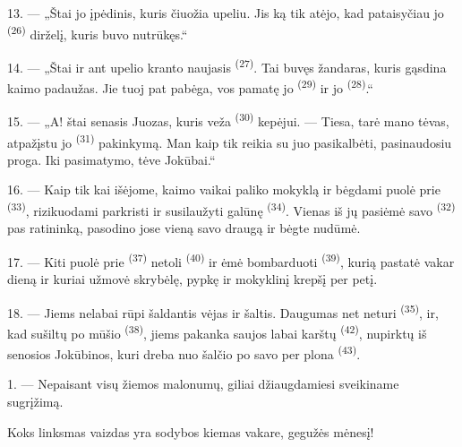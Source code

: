 13. --- „Štai jo įpėdinis, kuris čiuožia upeliu. Jis ką tik atėjo, kad pataisyčiau
jo  \textsuperscript{(26)} dirželį, kuris buvo nutrūkęs.“

14. --- „Štai ir ant upelio kranto naujasis 
\textsuperscript{(27)}. Tai buvęs žandaras, kuris gąsdina kaimo padaužas. Jie tuoj
pat pabėga, vos pamatę jo  \textsuperscript{(29)} ir jo
 \textsuperscript{(28)}.“

15. --- „A! štai senasis Juozas, kuris veža 
\textsuperscript{(30)} kepėjui. --- Tiesa, tarė mano tėvas, atpažįstu jo
 \textsuperscript{(31)} pakinkymą. Man kaip tik reikia su juo pasikalbėti,
pasinaudosiu proga. Iki pasimatymo, tėve Jokūbai.“

16. --- Kaip tik kai išėjome, kaimo vaikai paliko mokyklą ir bėgdami puolė prie
 \textsuperscript{(33)}, rizikuodami parkristi ir susilaužyti
galūnę  \textsuperscript{(34)}. Vienas iš jų pasiėmė savo
 \textsuperscript{(32)} pas ratininką, pasodino jose vieną savo draugą ir
bėgte nudūmė.

17. --- Kiti puolė prie  \textsuperscript{(37)} netoli
 \textsuperscript{(40)} ir ėmė bombarduoti 
\textsuperscript{(39)}, kurią pastatė vakar dieną ir kuriai užmovė skrybėlę, pypkę ir
mokyklinį krepšį per petį.

18. --- Jiems nelabai rūpi šaldantis vėjas ir šaltis. Daugumas net neturi
 \textsuperscript{(35)}, ir, kad sušiltų po mūšio  \textsuperscript{(38)}, jiems pakanka saujos labai karštų 
\textsuperscript{(42)}, nupirktų iš senosios  Jokūbinos, kuri dreba
nuo šalčio po savo per plona  \textsuperscript{(43)}.

\VUsaut{3.0mm}
\VUsaut{3.0mm}

\VUsaut{4.0mm}

1. --- Nepaisant visų žiemos malonumų, giliai džiaugdamiesi sveikiname
 sugrįžimą.

Koks linksmas vaizdas yra sodybos kiemas vakare, gegužės mėnesį!


